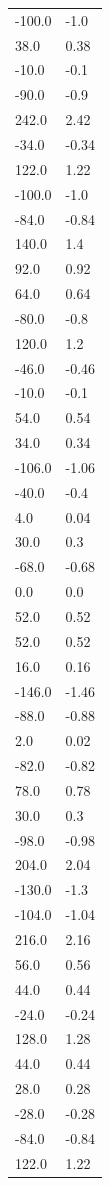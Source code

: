 \begin{longtable}{ll}
-100.0 & -1.0 \\
38.0 & 0.38 \\
-10.0 & -0.1 \\
-90.0 & -0.9 \\
242.0 & 2.42 \\
-34.0 & -0.34 \\
122.0 & 1.22 \\
-100.0 & -1.0 \\
-84.0 & -0.84 \\
140.0 & 1.4 \\
92.0 & 0.92 \\
64.0 & 0.64 \\
-80.0 & -0.8 \\
120.0 & 1.2 \\
-46.0 & -0.46 \\
-10.0 & -0.1 \\
54.0 & 0.54 \\
34.0 & 0.34 \\
-106.0 & -1.06 \\
-40.0 & -0.4 \\
4.0 & 0.04 \\
30.0 & 0.3 \\
-68.0 & -0.68 \\
0.0 & 0.0 \\
52.0 & 0.52 \\
52.0 & 0.52 \\
16.0 & 0.16 \\
-146.0 & -1.46 \\
-88.0 & -0.88 \\
2.0 & 0.02 \\
-82.0 & -0.82 \\
78.0 & 0.78 \\
30.0 & 0.3 \\
-98.0 & -0.98 \\
204.0 & 2.04 \\
-130.0 & -1.3 \\
-104.0 & -1.04 \\
216.0 & 2.16 \\
56.0 & 0.56 \\
44.0 & 0.44 \\
-24.0 & -0.24 \\
128.0 & 1.28 \\
44.0 & 0.44 \\
28.0 & 0.28 \\
-28.0 & -0.28 \\
-84.0 & -0.84 \\
122.0 & 1.22 \\

\end{longtable}
